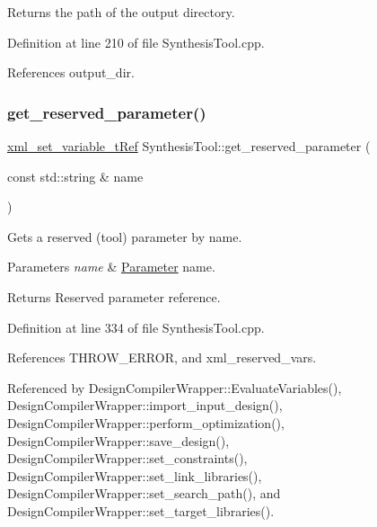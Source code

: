 Returns the path of the output directory. 



Definition at line 210 of file Synthesis\+Tool.\+cpp.



References output\+\_\+dir.

\mbox{\label{classSynthesisTool_abcbbbb7757278ee775afff2e7b7459c3}} 
\subsubsection{\texorpdfstring{get\+\_\+reserved\+\_\+parameter()}{get\_reserved\_parameter()}}
{\footnotesize\ttfamily \hyperlink{xml__script__command_8hpp_a77453d591123aae088dbc1d0efe15f00}{xml\+\_\+set\+\_\+variable\+\_\+t\+Ref} Synthesis\+Tool\+::get\+\_\+reserved\+\_\+parameter (\begin{DoxyParamCaption}\item[{const std\+::string \&}]{name }\end{DoxyParamCaption})}



Gets a reserved (tool) parameter by name. 


\begin{DoxyParams}{Parameters}
{\em name} & \hyperlink{classParameter}{Parameter} name. \\
\hline
\end{DoxyParams}
\begin{DoxyReturn}{Returns}
Reserved parameter reference. 
\end{DoxyReturn}


Definition at line 334 of file Synthesis\+Tool.\+cpp.



References T\+H\+R\+O\+W\+\_\+\+E\+R\+R\+OR, and xml\+\_\+reserved\+\_\+vars.



Referenced by Design\+Compiler\+Wrapper\+::\+Evaluate\+Variables(), Design\+Compiler\+Wrapper\+::import\+\_\+input\+\_\+design(), Design\+Compiler\+Wrapper\+::perform\+\_\+optimization(), Design\+Compiler\+Wrapper\+::save\+\_\+design(), Design\+Compiler\+Wrapper\+::set\+\_\+constraints(), Design\+Compiler\+Wrapper\+::set\+\_\+link\+\_\+libraries(), Design\+Compiler\+Wrapper\+::set\+\_\+search\+\_\+path(), and Design\+Compiler\+Wrapper\+::set\+\_\+target\+\_\+libraries().

